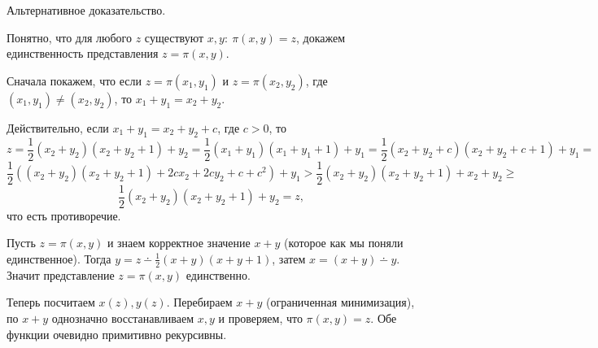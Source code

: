 Альтернативное доказательство.
\begin{proof*}
    Понятно, что для любого $z$ существуют $x, y:\: \pi(x, y) = z$, докажем единственность представления $z = \pi(x, y)$. 
    
    Сначала покажем, что если $z = \pi(x_1, y_1)$ и $z = \pi(x_2, y_2)$, где $(x_1, y_1) \neq (x_2, y_2)$, то $x_1 + y_1 = x_2 + y_2$. 
    
    Действительно, если 
    $x_1 + y_1 = x_2 + y_2 + c$, где $c > 0$, то 
    \[
        z = \frac{1}{2}(x_2 + y_2)(x_2 + y_2 + 1) + y_2 = \frac{1}{2}(x_1 + y_1)(x_1 + y_1 + 1) + y_1 = \frac{1}{2}(x_2 + y_2 + c)(x_2 + y_2 + c + 1) + y_1 =
    \]
    \[
        \frac{1}{2}((x_2 + y_2)(x_2 + y_2 + 1) + 2cx_2 + 2cy_2 + c + c^2) + y_1 > \frac{1}{2}(x_2 + y_2)(x_2 + y_2 + 1) + x_2 + y_2 \geq
    \]
    \[
        \frac{1}{2}(x_2 + y_2)(x_2 + y_2 + 1) + y_2 = z,
    \]
    что есть противоречие. 
    
    Пусть $z = \pi(x, y)$ и знаем корректное значение $x + y$ (которое как мы поняли единственное). Тогда $y = z \dotminus \frac{1}{2}(x + y)(x + y + 1)$, затем $x = (x + y) \dotminus y$. Значит представление $z = \pi(x, y)$ единственно.
    
    Теперь посчитаем $x(z), y(z)$. Перебираем $x + y$ (ограниченная минимизация), по $x + y$ однозначно восстанавливаем $x, y$ и проверяем, что $\pi(x, y) = z$. Обе функции очевидно примитивно рекурсивны.
    
\end{proof*}


\newpage
